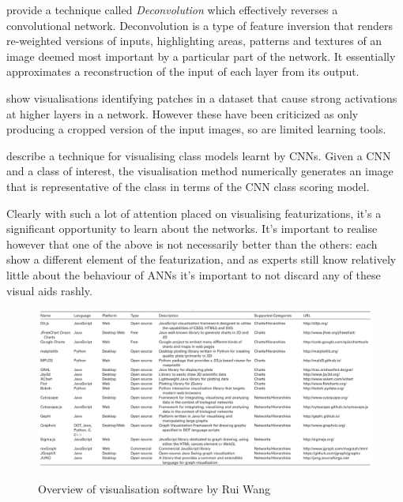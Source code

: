 \documentclass[a4paper,11pt,titlepage]{article}
\begin{document}
		\textbf{\cite{Zeiler2013}} provide a technique called \textit{Deconvolution} \cite{Zeiler2011} which effectively reverses a convolutional network. Deconvolution is a type of feature inversion that renders re-weighted versions of inputs, highlighting areas, patterns and textures of an image deemed most important by a particular part of the network. It essentially approximates a reconstruction of the input of each layer from its output.
		\par
		\textbf{\cite{Donahue2013}} show visualisations identifying patches in a dataset that cause strong activations at higher layers in a network. However these have been criticized as only producing a cropped version of the input images, so are limited learning tools. 
		\par 
		\textbf{\cite{Simonyan2013}} describe a technique for visualising class models learnt by CNNs. Given a CNN and a class of interest, the visualisation method numerically generates an image that is representative of the class in terms of the CNN class scoring model.
		\par 
		Clearly with such a lot of attention placed on visualising featurizations, it's a significant opportunity to learn about the networks. It's important to realise however that one of the above is not necessarily better than the others: each show a different element of the featurization, and as experts still know relatively little about the behaviour of ANNs it's important to not discard any of these visual aids rashly.
		
		\begin{figure}[H]
    			\centering	
		{{\includegraphics[width=18cm]
    				{img/rui_wang_vis_overview} 
    			}}%
    			\caption{Overview of visualisation software by Rui Wang}%
    		\label{fig:studentprofile}
		\end{figure}

\clearpage 
\end{document}
